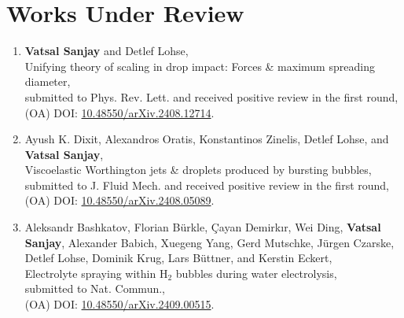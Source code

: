 \documentclass[11pt,a4paper,roman,english,colorlinks,linkcolor={red!50!black}]{moderncv}
\begin{document}
\section{\textbf{Works Under Review}}

\begin{enumerate}[leftmargin=0.75cm]
	\item \textbf{Vatsal Sanjay} and Detlef Lohse,\\
	Unifying theory of scaling in drop impact: Forces \& maximum spreading diameter,\\
	submitted to Phys. Rev. Lett. and received positive review in the first round,\\
	(OA) DOI: \href{https://doi.org/10.48550/arXiv.2408.12714}{10.48550/arXiv.2408.12714}.

	\item Ayush K. Dixit, Alexandros Oratis, Konstantinos Zinelis, Detlef Lohse, and \textbf{Vatsal Sanjay},\\
	Viscoelastic Worthington jets \& droplets produced by bursting bubbles,\\
	submitted to J. Fluid Mech. and received positive review in the first round,\\
	(OA) DOI: \href{https://doi.org/10.48550/arXiv.2408.05089}{10.48550/arXiv.2408.05089}.

	\item Aleksandr Bashkatov, Florian Bürkle, Çayan Demirkır, Wei Ding, \textbf{Vatsal Sanjay}, Alexander Babich, Xuegeng Yang, Gerd Mutschke, Jürgen Czarske, Detlef Lohse, Dominik Krug, Lars Büttner, and Kerstin Eckert,\\
	Electrolyte spraying within H$_2$ bubbles during water electrolysis,\\
	submitted to Nat. Commun.,\\
	(OA) DOI: \href{https://doi.org/10.48550/arXiv.2409.00515}{10.48550/arXiv.2409.00515}.

\end{enumerate}
\end{document}
